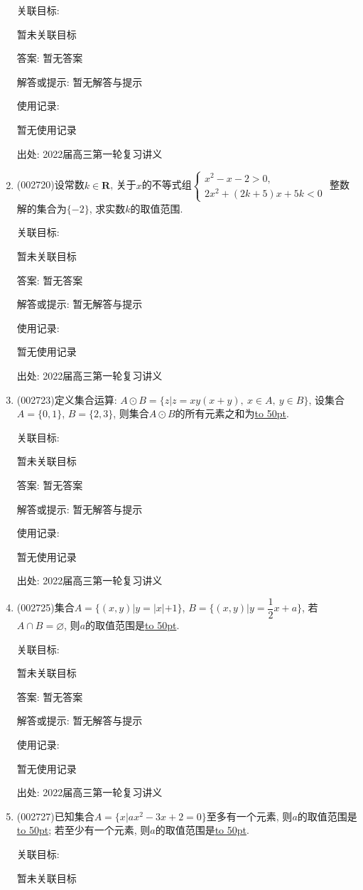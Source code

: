 \documentclass[10pt,a4paper]{article}
\newcommand{\blank}[1]{\underline{\hbox to #1pt{}}}
\begin{document}
\begin{enumerate}[1.]
关联目标:

暂未关联目标

答案: 暂无答案

解答或提示: 暂无解答与提示

使用记录:

暂无使用记录


出处: 2022届高三第一轮复习讲义
\item { (002720)}设常数$k\in \mathbf{R}$, 关于$x$的不等式组$\begin{cases} x^2-x-2>0, \\ 2x^2+(2k+5)x+5k<0 \end{cases}$ 整数解的集合为$\{-2\}$, 求实数$k$的取值范围.


关联目标:

暂未关联目标

答案: 暂无答案

解答或提示: 暂无解答与提示

使用记录:

暂无使用记录


出处: 2022届高三第一轮复习讲义
\item { (002723)}定义集合运算: $A\odot B=\{z|z=xy(x+y), \ x\in A, \ y\in B \}$, 设集合$A=\{0,1\}$, $B=\{2,3\}$, 则集合$A\odot B$的所有元素之和为\blank{50}.


关联目标:

暂未关联目标

答案: 暂无答案

解答或提示: 暂无解答与提示

使用记录:

暂无使用记录


出处: 2022届高三第一轮复习讲义
\item { (002725)}集合$A=\{(x,y)|y=|x|+1\}$, $B=\{(x,y)|y=\dfrac12x+a\}$, 若$A\cap B=\varnothing$, 则$a$的取值范围是\blank{50}.


关联目标:

暂未关联目标

答案: 暂无答案

解答或提示: 暂无解答与提示

使用记录:

暂无使用记录


出处: 2022届高三第一轮复习讲义
\item { (002727)}已知集合$A=\{x|ax^2-3x+2=0\}$至多有一个元素, 则$a$的取值范围是\blank{50}; 若至少有一个元素, 则$a$的取值范围是\blank{50}.


关联目标:

暂未关联目标


\end{enumerate}
\end{document}
